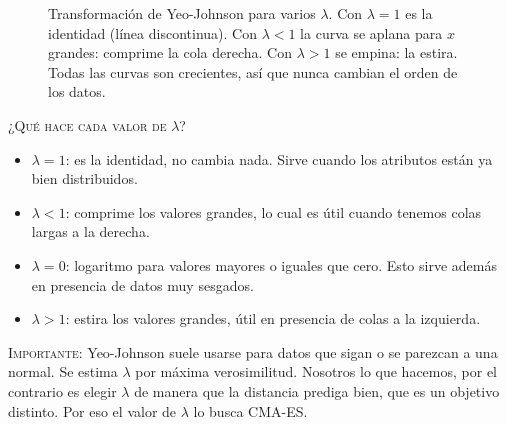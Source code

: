 \begin{figure}[htbp]
\centering
{}
\caption{Transformación de Yeo-Johnson para varios $\lambda$. Con $\lambda=1$ es
la identidad (línea discontinua). Con $\lambda<1$ la curva se aplana para $x$
grandes: comprime la cola derecha. Con $\lambda>1$ se empina: la estira. Todas las
curvas son crecientes, así que nunca cambian el orden de los datos.}
\label{fig:yeojohnson}
\end{figure}

\textsc{¿Qué hace cada valor de $\lambda$?}

\begin{itemize}
    \item $\lambda=1$: es la identidad, no cambia nada. Sirve cuando los atributos están ya bien distribuidos. 
    \item $\lambda < 1$: comprime los valores grandes, lo cual es útil cuando tenemos colas  largas a la derecha. 
    \item $\lambda = 0$: logaritmo para valores mayores o iguales que cero. Esto sirve además en presencia de datos muy sesgados.
    \item $\lambda>1$: estira los valores grandes, útil en presencia de colas a la izquierda.
\end{itemize}

\textsc{Importante}: Yeo-Johnson suele usarse para datos que sigan o se parezcan a una normal. Se estima $\lambda$ por máxima verosimilitud. Nosotros lo que hacemos, por el contrario es elegir $\lambda$ de manera que la distancia prediga bien, que es un objetivo distinto. Por eso el valor de $\lambda$ lo busca CMA-ES.

